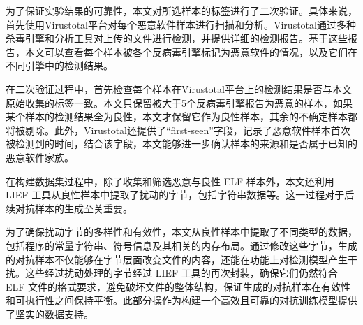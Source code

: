 为了保证实验结果的可靠性，本文对所选样本的标签进行了二次验证。具体来说，首先使用Virustotal平台对每个恶意软件样本进行扫描和分析。Virustotal通过多种杀毒引擎和分析工具对上传的文件进行检测，并提供详细的检测报告。基于这些报告，本文可以查看每个样本被各个反病毒引擎标记为恶意软件的情况，以及它们在不同引擎中的检测结果。


在二次验证过程中，首先检查每个样本在Virustotal平台上的检测结果是否与本文原始收集的标签一致。本文只保留被大于5个反病毒引擎报告为恶意的样本，如果某个样本的检测结果全为良性，本文才保留它作为良性样本，其余的不确定样本都将被剔除。此外，Virustotal还提供了“first-seen”字段，记录了恶意软件样本首次被检测到的时间，结合该字段，本文能够进一步确认样本的来源和是否属于已知的恶意软件家族。


在构建数据集过程中，除了收集和筛选恶意与良性 ELF 样本外，本文还利用 LIEF 工具从良性样本中提取了扰动的字节，包括字符串数据等。这一过程对于后续对抗样本的生成至关重要。


为了确保扰动字节的多样性和有效性，本文从良性样本中提取了不同类型的数据，包括程序的常量字符串、符号信息及其相关的内存布局。通过修改这些字节，生成的对抗样本不仅能够在字节层面改变文件的内容，还能在功能上对检测模型产生干扰。这些经过扰动处理的字节经过 LIEF 工具的再次封装，确保它们仍然符合 ELF 文件的格式要求，避免破坏文件的整体结构，保证生成的对抗样本在有效性和可执行性之间保持平衡。此部分操作为构建一个高效且可靠的对抗训练模型提供了坚实的数据支持。

